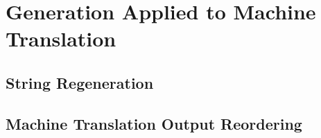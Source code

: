 \chapter{Generation Applied to Machine Translation}

\section{String Regeneration}

\section{Machine Translation Output Reordering}

